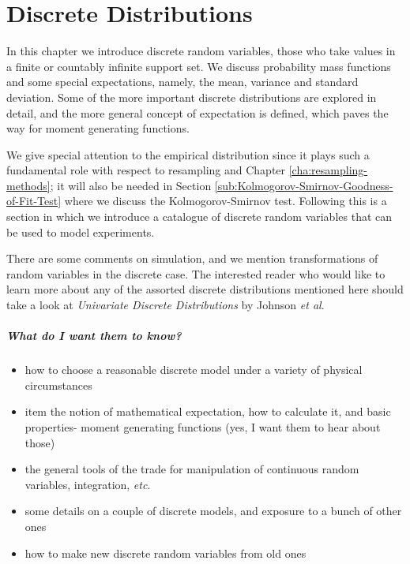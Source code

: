 \documentclass[captions=tableheading]{scrbook}
\begin{document}
\chapter{Discrete Distributions}
\label{sec-5}

\label{cha:Discrete-Distributions}


\noindent In this chapter we introduce discrete random variables, those who take values in a finite or countably infinite support set. We discuss probability mass functions and some special expectations, namely, the mean, variance and standard deviation. Some of the more important discrete distributions are explored in detail, and the more general concept of expectation is defined, which paves the way for moment generating functions. 

We give special attention to the empirical distribution since it plays such a fundamental role with respect to resampling and Chapter \ref{cha:resampling-methods}; it will also be needed in Section \ref{sub:Kolmogorov-Smirnov-Goodness-of-Fit-Test} where we discuss the Kolmogorov-Smirnov test. Following this is a section in which we introduce a catalogue of discrete random variables that can be used to model experiments.

There are some comments on simulation, and we mention transformations of random variables in the discrete case. The interested reader who would like to learn more about any of the assorted discrete distributions mentioned here should take a look at \emph{Univariate Discrete Distributions} by Johnson \emph{et al}\cite{Johnson1993}.


\paragraph*{What do I want them to know?}

\begin{itemize}
\item how to choose a reasonable discrete model under a variety of physical circumstances
\item item the notion of mathematical expectation, how to calculate it, and basic properties- moment generating functions (yes, I want them to hear about those)
\item the general tools of the trade for manipulation of continuous random variables, integration, \emph{etc}.
\item some details on a couple of discrete models, and exposure to a bunch of other ones
\item how to make new discrete random variables from old ones
\end{itemize}
\end{document}

